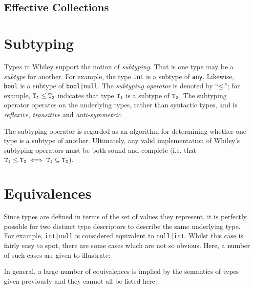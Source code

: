 \subsection{Effective Collections}

\section{Subtyping}
\label{c_types_subtyping}
Types in Whiley support the notion of {\em subtyping}.  That is one type may be a {\em subtype} for another.  For example, the type \lstinline{int} is a subtype of \lstinline{any}.  Likewise, \lstinline{bool} is a subtype of \lstinline{bool|null}.  The {\em subtyping operator} is denoted by ``${\tt \le}$''; for example, ${\tt T_1\le T_2}$ indicates that type ${\tt T_1}$ is a subtype of ${\tt T_2}$.  The subtyping operator operates on the underlying types, rather than syntactic types, and is {\em reflexive}, {\em transitive} and {\em anti-symmetric}. 

The subtyping operator is regarded as an algorithm for determining whether one type is a subtype of another.  Ultimately, any valid implementation of Whiley's subtyping operators must be both sound and complete (i.e. that ${\tt T_1\le T_2 \iff T_1 \subseteq T_2}$). 

\section{Equivalences}
Since types are defined in terms of the set of values they represent, it is perfectly possible for two distinct type descriptors to describe the same underlying type.  For example, \lstinline{int|null} is considered equivalent to \lstinline{null|int}.  Whilst this case is fairly easy to spot, there are some cases which are not so obvious.  Here, a number of such cases are given to illustrate:

In general, a large number of equivalences is implied by the semantics of types given previously and they cannot all be listed here.